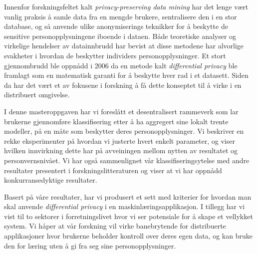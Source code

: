 \noindent 
Innenfor forskningsfeltet kalt \textit{privacy-preserving data mining} har det lenge v{\ae}rt vanlig praksis {\aa} samle data fra en mengde brukere, sentralisere den i en stor database, og s{\aa} anvende ulike anonymiserings teknikker for {\aa} beskytte de sensitive personopplysningene iboende i dataen. B{\aa}de teoretiske analyser og virkelige hendelser av datainnbrudd har bevist at disse metodene har alvorlige svakheter i hvordan de beskytter individers personopplysninger. Et stort gjennombrudd ble oppn{\aa}dd i 2006 da en metode kalt \textit{differential privacy} ble framlagt som en matematisk garanti for {\aa} beskytte hver rad i et datasett. Siden da har det v{\ae}rt et av fokusene i forskning {\aa} f{\aa} dette konseptet til {\aa} virke i en distribuert omgivelse.

I denne masteroppgaven har vi foresl{\aa}tt et desentralisert rammeverk som lar brukerne gjennomf{\o}re klassifisering etter {\aa} ha aggregert sine lokalt trente modeller, p{\aa} en m{\aa}te som beskytter deres personopplysninger. Vi beskriver en rekke eksperimenter p{\aa} hvordan vi justerte hvert enkelt parameter, og viser hvilken innvirkning dette har p{\aa} avveiningen mellom nytten av resultatet og personvernsniv{\aa}et. Vi har ogs{\aa} sammenlignet v{\aa}r klassifiseringsytelse med andre resultater presentert i forskningslitteraturen og viser at vi har oppn{\aa}dd konkurransedyktige resultater.     

Basert p{\aa} v{\aa}re resultater, har vi produsert et sett med kriterier for hvordan man skal anvende \textit{differential privacy} i en maskinl{\ae}ringsapplikasjon. I tillegg har vi vist til to sektorer i forretningslivet hvor vi ser potensiale for {\aa} skape et 
vellykket system. Vi h{\aa}per at v{\aa}r forskning vil virke banebrytende for distribuerte applikasjoner hvor brukerne beholder kontroll over deres egen data, og kan bruke den for l{\ae}ring uten {\aa} gi fra seg sine personopplysninger.   

\cleardoublepage